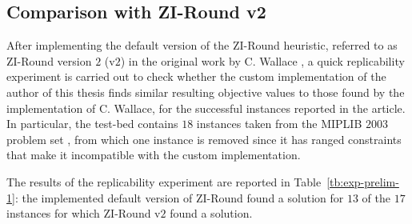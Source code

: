 \documentclass[a4paper,12pt]{book}
\begin{document}
\subsection{Comparison with ZI-Round v2}
After implementing the default version of the ZI-Round heuristic, referred to as ZI-Round version $2$ (v$2$) in the original work by C. Wallace \cite{wallace2010}, a quick replicability experiment is carried out to check whether the custom implementation of the author of this thesis finds similar resulting objective values to those found by the implementation of C. Wallace, for the successful instances reported in the article. In particular, the test-bed contains $18$ instances taken from the MIPLIB $2003$ problem set \cite{miplib2003}, from which one instance is removed since it has ranged constraints that make it incompatible with the custom implementation. \par
The results of the replicability experiment are reported in Table~\ref{tb:exp-prelim-1}: the implemented default version of ZI-Round found a solution for $13$ of the $17$ instances for which ZI-Round v$2$ found a solution.
\end{document}
